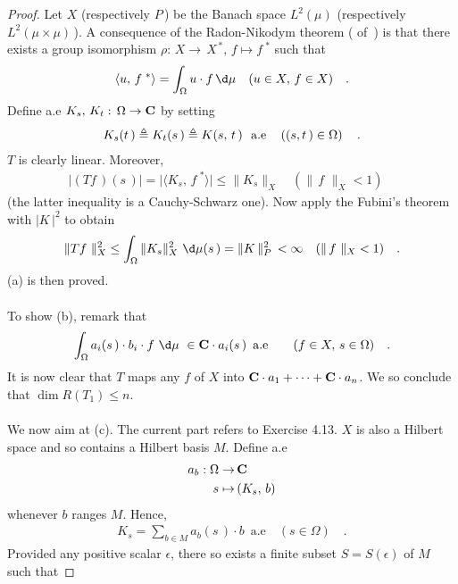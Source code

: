 \begin{proof} Let $X$ (respectively $P\,$) be the Banach space $L^2(\mu)$ (respectively $L^2(\mu\times \mu)\,$). A consequence of the Radon-Nikodym theorem ( of \cite{BigRudin}\,) is that there exists a group isomorphism $\rho:\, X\to \, X^{\,\ast},\, f\mapsto f^{\,\,\ast}$ such that
\begin{align}
\langle u ,\, f^{\,\,\ast}  \rangle =\int_\Omega u\cdot f \, \d\mu  \quad (u\in X,\, f\in X)\quad .
\end{align}
Define a.e $K_s,\, K_t:\, \Omega\to {\mathbf C}$ by setting
\begin{align}
K_s(t\,)\triangleq K_t(s\,)\triangleq  K(s,\, t\,)\, \, \text{ a.e}\quad \left((s,t\,)\in \Omega\right)\quad .
\end{align}
$T$ is clearly linear. Moreover, 
\begin{align}
\lvert (T f\,)(s\,) \rvert = \lvert \langle K_s,\, f^{\,\,\ast} \rangle \rvert \leq \| K_s\|_X\quad(\|\,f\,\,\|_X < 1) \quad
\end{align}
(the latter inequality is a Cauchy-Schwarz one). Now apply the Fubini's theorem with $\lvert K\,\rvert^2$ to obtain
\begin{align}
\|Tf\,\,\|^2_X \leq \int_\Omega \| K_s\|^2_X \, \,\d \mu (s\,)  =\| K\,\|_P^2 \,< \infty \quad(\|\,f\,\,\|_X < 1)\quad  .
\end{align}
(a) is then proved. \\
\\
To show (b), remark that
\begin{align}
\int_\Omega a_i (s\,) \cdot b_i \cdot f  \,\,\d\mu \,\,\in \C\cdot  a_i(s\,)\,\,\,\text{a.e}\quad \quad (f\in X, \, s\in \Omega)  \quad.
\end{align}
It is now clear that $T$ maps any $f$ of $X$ into ${\mathbf C} \cdot a_1+\dotsb+ {\mathbf C}\cdot a_n$. We so conclude that $\dim R(T_1)\leq n $. \\
\\
We now aim at (c). The current part refers to Exercise 4.13. $X$ is also a Hilbert space and so contains a Hilbert basis $M$. Define a.e
\begin{align}
a_b: \Omega \to &\,{\mathbf C}   \\
 s \mapsto &\,(K_s,\, b) \nonumber
\end{align}
whenever $b$ ranges $M$. Hence,
\begin{align}
K_s= \sum_{b\in M} a_b(s\,) \cdot b \, \text{ a.e} \quad (s\in \Omega) \quad.
\end{align}
Provided any positive scalar $\epsilon$, there so exists a finite subset $S=S(\epsilon)$ of $M$ such that

\end{proof}
